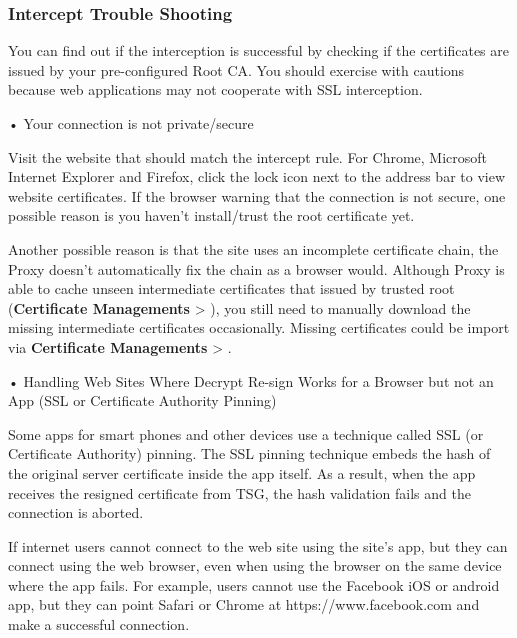 \subsubsection*{\hypertarget{link:Intercept Trouble Shooting}{Intercept Trouble Shooting}}
\label{sec:policies:security:intercept:troubleshooting}

You can find out if the interception is successful by checking if the certificates are issued by your pre-configured Root CA. 
You should exercise with cautions because web applications may not cooperate with SSL interception.


• Your connection is not private/secure


Visit the website that should match the intercept rule. For Chrome, Microsoft Internet Explorer and Firefox, click the lock icon next to the address bar to view website certificates. 
If the browser warning that the connection is not secure, one possible reason is you haven’t install/trust the root certificate yet. 


Another possible reason is that the site uses an incomplete certificate chain, the Proxy doesn’t automatically fix the chain as a browser would. 
Although Proxy is able to cache unseen intermediate certificates that issued 
by trusted root (\textbf{Certificate Managements} > \textbf{\hyperlink{link:Cached Intermediate Certificates}{\color{linkblue}{Cached Intermediate Certificates}}}), 
you still need to manually download the missing intermediate certificates occasionally. 
Missing certificates could be import via \textbf{Certificate Managements} > \textbf{\hyperlink{link:Trusted Certificate Authorities}{\color{linkblue}{Trusted Certificate Authorities}}}.


• Handling Web Sites Where Decrypt Re-sign Works for a Browser but not an App (SSL or Certificate Authority Pinning)


Some apps for smart phones and other devices use a technique called SSL (or Certificate Authority) pinning. 
The SSL pinning technique embeds the hash of the original server certificate inside the app itself. 
As a result, when the app receives the resigned certificate from TSG, the hash validation fails and the connection is aborted. 


If internet users cannot connect to the web site using the site’s app, but they can connect using the web browser, 
even when using the browser on the same device where the app fails. For example, users cannot use the Facebook iOS or android app, 
but they can point Safari or Chrome at https://www.facebook.com and make a successful connection. 


